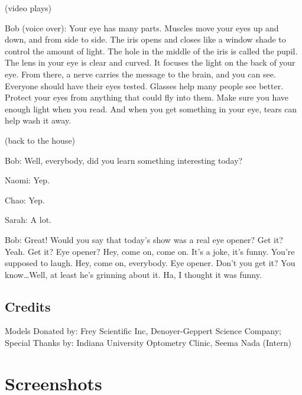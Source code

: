 (video plays)

Bob (voice over): Your eye has many parts. Muscles move your eyes up and down, and from side to side. The iris opens and closes like a window shade to control the amount of light. The hole in the middle of the iris is called the pupil. The lens in your eye is clear and curved. It focuses the light on the back of your eye. From there, a nerve carries the message to the brain, and you can see. Everyone should have their eyes tested. Glasses help many people see better. Protect your eyes from anything that could fly into them. Make sure you have enough light when you read. And when you get something in your eye, tears can help wash it away.

(back to the house)

Bob: Well, everybody, did you learn something interesting today?

Naomi: Yep.

Chao: Yep.

Sarah: A lot.

Bob: Great! Would you say that today's show was a real eye opener? Get it? Yeah. Get it? Eye opener? Hey, come on, come on. It's a joke, it's funny. You're supposed to laugh. Hey, come on, everybody. Eye opener. Don't you get it? You know\dots Well, at least he's grinning about it. Ha, I thought it was funny.

\subsection{Credits}

Models Donated by: Frey Scientific Inc, Denoyer-Geppert Science Company;
Special Thanks by: Indiana University Optometry Clinic, Seema Nada (Intern)


\clearpage
\newpage

\section{Screenshots}

